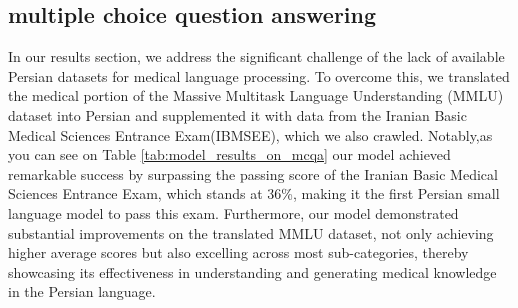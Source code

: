 \documentclass[conference]{IEEEtran}
\begin{document}
\subsection{multiple choice question answering}
In our results section, we address the significant challenge of the lack of available Persian datasets for medical language processing. To overcome this, we translated the medical portion of the Massive Multitask Language Understanding (MMLU)
\cite{b18}
dataset into Persian and supplemented it with data from the Iranian Basic Medical Sciences Entrance Exam(IBMSEE), which we also crawled. Notably,as you can see on Table
\ref{tab:model_results_on_mcqa}
our model achieved remarkable success by surpassing the passing score of the Iranian Basic Medical Sciences Entrance Exam, which stands at 36\%, making it the first Persian small language model to pass this exam. Furthermore, our model demonstrated substantial improvements on the translated MMLU dataset, not only achieving higher average scores but also excelling across most sub-categories, thereby showcasing its effectiveness in understanding and generating medical knowledge in the Persian language.
\end{document}
